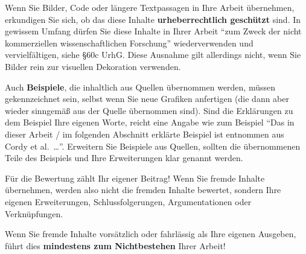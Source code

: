 Wenn Sie Bilder, Code oder längere Textpassagen in Ihre Arbeit übernehmen, erkundigen Sie sich, ob das diese Inhalte \textbf{urheberrechtlich geschützt} sind. In gewissem Umfang dürfen Sie diese Inhalte in Ihrer Arbeit \enquote{zum Zweck der nicht kommerziellen wissenschaftlichen Forschung} wiederverwenden und vervielfältigen, siehe §60c UrhG. Diese Ausnahme gilt allerdings nicht, wenn Sie Bilder rein zur visuellen Dekoration verwenden.

Auch \textbf{Beispiele}, die inhaltlich aus Quellen übernommen werden, müssen gekennzeichnet sein, selbst wenn Sie neue Grafiken anfertigen (die dann aber wieder sinngemäß aus der Quelle übernommen sind). Sind die Erklärungen zu dem Beispiel Ihre eigenen Worte, reicht eine Angabe wie zum Beispiel "`Das in dieser Arbeit / im folgenden Abschnitt erklärte Beispiel ist entnommen aus Cordy et al.~\cite{Cordy2012}\ldots"'. Erweitern Sie Beispiele aus Quellen, sollten die übernommenen Teile des Beispiels und Ihre Erweiterungen klar genannt werden.

Für die Bewertung zählt Ihr eigener Beitrag! Wenn Sie fremde Inhalte übernehmen, werden also nicht die fremden Inhalte bewertet, sondern Ihre eigenen Erweiterungen, Schlussfolgerungen, Argumentationen oder Verknüpfungen.

Wenn Sie fremde Inhalte vorsätzlich oder fahrlässig als Ihre eigenen Ausgeben, führt dies \textbf{mindestens zum Nichtbestehen} Ihrer Arbeit!